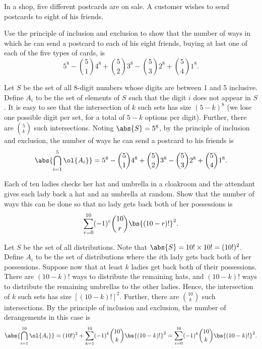 \begin{problem}
    In a shop, five different postcards are on sale. A customer wishes to send postcards to eight of his friends.

    Use the principle of inclusion and exclusion to show that the number of ways in which he can send a postcard to each of his eight friends, buying at last one of each of the five types of cards, is \[5^8 - \binom{5}{1} 4^8 + \binom{5}{2} 3^8 - \binom{5}{3} 2^8 + \binom{5}{4} 1^8.\]
\end{problem}
\begin{solution}
    Let $S$ be the set of all 8-digit numbers whose digits are between 1 and 5 inclusive. Define $A_i$ to be the set of elements of $S$ such that the digit $i$ does not appear in $S$. It is easy to see that the intersection of $k$ such sets has size $(5-k)^8$ (we lose one possible digit per set, for a total of $5-k$ options per digit). Further, there are $\binom{5}{k}$ such intersections. Noting $\abs{S} = 5^8$, by the principle of inclusion and exclusion, the number of ways he can send a postcard to his friends is \[\abs{\bigcap_{i = 1}^5 \ol{A_i}} = 5^8 - \binom{5}{1} 4^8 + \binom{5}{2} 3^8 - \binom{5}{3} 2^8 + \binom{5}{4} 1^8.\]
\end{solution}

\begin{problem}
    Each of ten ladies checks her hat and umbrella in a cloakroom and the attendant gives each lady back a hat and an umbrella at random. Show that the number of ways this can be done so that no lady gets back both of her possessions is \[\sum_{r = 0}^{10} (-1)^r \binom{10}{r} \bs{(10-r)!}^2.\]
\end{problem}
\begin{solution}
    Let $S$ be the set of all distributions. Note that $\abs{S} =  10! \times 10! = (10!)^2$. Define $A_i$ to be the set of distributions where the $i$th lady gets back both of her possessions. Suppose now that at least $k$ ladies get back both of their possessions. There are $(10-k)!$ ways to distribute the remaining hats, and $(10-k)!$ ways to distribute the remaining umbrellas to the other ladies. Hence, the intersection of $k$ such sets has size $[(10-k)!]^2$. Further, there are $\binom{10}{k}$ such intersections. By the principle of inclusion and exclusion, the number of derangements in this case is \[\abs{\bigcap_{i = 1}^{10} \ol{A_i}} = (10!)^2 + \sum_{k = 1}^{10} (-1)^k \binom{10}{k} \bs{(10-k)!}^2 = \sum_{i = 0}^{10} (-1)^k \binom{10}{k} \bs{(10-k)!}^2.\]
\end{solution}

